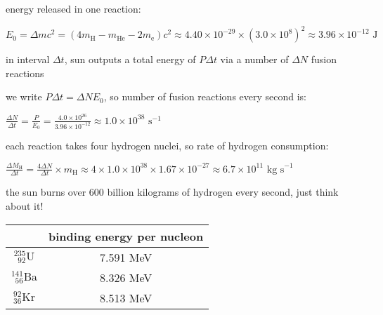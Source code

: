 \begin{soln}
    
 energy released in one reaction:

{
	
	\centering

	$E_0 = \Delta mc^2 = (4m_\text{H} - m_\text{He} - 2m_\text{e}) c^2 \approx 4.40\times10^{-29} \times (3.0\times10^8)^2 \approx 3.96\times10^{-12} \text{ J}$
	
}

in interval $\Delta t$, sun outputs a total energy of $P\Delta t$ via a number of $\Delta N$ fusion reactions

we write $P\Delta t = \Delta N E_0$, so number of fusion reactions every second is:

{
	
	\centering
	
	$\frac{\Delta N}{\Delta t} = \frac{P}{E_0} = \frac{4.0\times10^{26}}{3.96\times10^{-12}} \approx 1.0\times 10^{38} \text{ s}^{-1}$
	
}

each reaction takes four hydrogen nuclei, so rate of hydrogen consumption:

{
	
	\centering
	
	$\frac{\Delta M_\text{H}}{\Delta t} = \frac{4\Delta N}{\Delta t} \times m_\text{H} \approx 4 \times 1.0\times 10^{38} \times1.67\times10^{-27} \approx 6.7\times10^{11} \text{ kg s}^{-1}$
	
}

the sun burns over 600 billion kilograms of hydrogen every second, just think about it! \end{soln}

\begin{marginfigure}
	\begin{tabular}{|c|c|}
		\hline
		& binding energy per nucleon \\ \hline
		\rule[-1em]{0pt}{3em}$^{235}_{\phantom{2}92}\text{U}$ & 7.591 MeV \\ \hline \rule[-1em]{0pt}{3em}$^{141}_{\phantom{1}56}\text{Ba}$ & 8.326 MeV\\ \hline \rule[-1em]{0pt}{3em}$^{92}_{36}\text{Kr}$ & 8.513 MeV\\ \hline
	\end{tabular}
\end{marginfigure}

	
